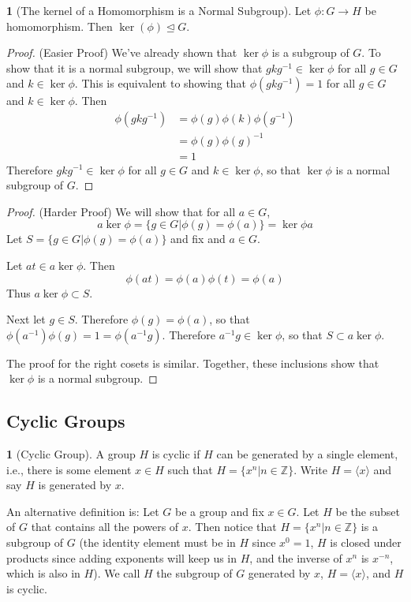\documentclass[12pt]{article}
\theoremstyle{definition}
\newtheorem{definition}{\color{NavyBlue}{\textbf{Definition}}}
\newtheorem{theorem}{\color{ForestGreen}{\textbf{Theorem}}}
\theoremstyle{definition}
\begin{document}
\begin{theorem}[The kernel of a Homomorphism is a Normal Subgroup]
Let $\phi : G \to H$ be homomorphism. Then $\ker (\phi) \trianglelefteq G$.
\end{theorem}
\begin{proof}(Easier Proof)
We've already shown that $\ker \phi$ is a subgroup of $G$. To show that it is a normal subgroup, we will show that $g k g^{-1} \in \ker \phi$ for all $g \in G$ and $k \in \ker \phi$. This is equivalent to showing that $\phi(g k g^{-1}) = 1$ for all $g \in G$ and $k \in \ker \phi$. Then
\begin{align*}
	\phi(g k g^{-1}) &= \phi(g)\phi(k)\phi(g^{-1}) \\
	&= \phi(g) \phi(g)^{-1} \\
	&= 1
\end{align*}
Therefore $g k g^{-1} \in \ker \phi$ for all $g \in G$ and $k \in \ker \phi$, so that $\ker \phi$ is a normal subgroup of $G$. 
\end{proof}

\begin{proof}(Harder Proof)
We will show that for all $a \in G$, 
\begin{equation}
	a \ker\phi = \{g \in G | \phi(g) = \phi(a) \} = \ker \phi a
\end{equation}
Let $S = \{g \in G | \phi(g) = \phi(a) \}$ and fix and $a \in G$. 

Let $at \in a \ker \phi$. Then 
\begin{equation}
	\phi(at) = \phi(a)\phi(t) = \phi(a)
\end{equation}
Thus $a \ker \phi \subset S$. 

Next let $g \in S$. Therefore $\phi(g) = \phi(a)$, so that $\phi(a^{-1}) \phi(g) = 1 = \phi(a^{-1}g)$. Therefore $a^{-1}g \in \ker \phi$, so that $S \subset a \ker\phi$. 

The proof for the right cosets is similar. Together, these inclusions show that $\ker \phi$ is a normal subgroup. 
\end{proof}

\subsection{Cyclic Groups}
\begin{definition}[Cyclic Group]
A group $H$ is cyclic if $H$ can be generated by a single element, i.e., there is some element $x \in H$ such that $H = \{x^n | n \in \mathbb{Z} \}$. Write $H  = \langle x \rangle$ and say $H$ is generated by $x$.

An alternative definition is: Let $G$ be a group and fix $x \in G$. Let $H$ be the subset of $G$ that contains all the powers of $x$. Then notice that $H = \{x^n | n \in \mathbb{Z} \}$ is a subgroup of $G$ (the identity element must be in $H$ since $x^0 = 1$, $H$ is closed under products since adding exponents will keep us in $H$, and the inverse of $x^n$ is $x^{-n}$, which is also in $H$). We call $H$ the subgroup of $G$ generated by $x$, $H = \langle x \rangle$, and $H$ is cyclic.  
\end{definition}
\end{document}
